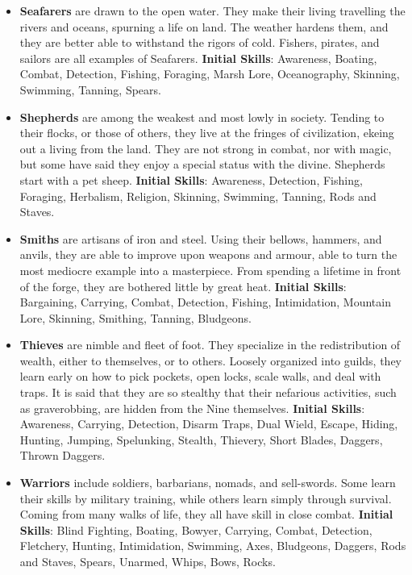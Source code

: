 \begin{itemize}
\item {\bf Seafarers} are drawn to the open water.  They make their living 
travelling the rivers and oceans, spurning a life on land.  The weather 
hardens them, and they are better able to withstand the rigors of cold.  
Fishers, pirates, and sailors are all examples of Seafarers.
\textbf{Initial Skills}: Awareness, Boating, Combat, Detection, Fishing,
Foraging, Marsh Lore, Oceanography, Skinning, Swimming, Tanning, Spears.

\item {\bf Shepherds} are among the weakest and most lowly in society.  
Tending to their flocks, or those of others, they live at the fringes of 
civilization, ekeing out a living from the land.  They are not strong in 
combat, nor with magic, but some have said they enjoy a special status 
with the divine.  Shepherds start with a pet sheep.  \textbf{Initial Skills}: 
Awareness, Detection, Fishing, Foraging, Herbalism, Religion, Skinning, 
Swimming, Tanning, Rods and Staves.

\item {\bf Smiths} are artisans of iron and steel.  Using their bellows, 
hammers, and anvils, they are able to improve upon weapons and armour, 
able to turn the most mediocre example into a masterpiece.  From spending 
a lifetime in front of the forge, they are bothered little by great heat.
\textbf{Initial Skills}: Bargaining, Carrying, Combat, Detection, 
Fishing, Intimidation, Mountain Lore, Skinning, Smithing, Tanning,
Bludgeons.

\item {\bf Thieves} are nimble and fleet of foot.  They specialize in the 
redistribution of wealth, either to themselves, or to others.  Loosely 
organized into guilds, they learn early on how to pick pockets, open 
locks, scale walls, and deal with traps.  It is said that they are so
stealthy that their nefarious activities, such as graverobbing, are hidden
from the Nine themselves.  \textbf{Initial Skills}: Awareness, Carrying, 
Detection, Disarm Traps, Dual Wield, Escape, Hiding, Hunting, Jumping, 
Spelunking, Stealth, Thievery, Short Blades, Daggers, Thrown Daggers.

\item {\bf Warriors} include soldiers, barbarians, nomads, and sell-swords.
Some learn their skills by military training, while others learn simply 
through survival.  Coming from many walks of life, they all have skill in 
close combat.  \textbf{Initial Skills}: Blind Fighting, Boating, Bowyer,
Carrying, Combat, Detection, Fletchery, Hunting, Intimidation, Swimming,
Axes, Bludgeons, Daggers, Rods and Staves, Spears, Unarmed, Whips, Bows,
Rocks.


\end{itemize}
